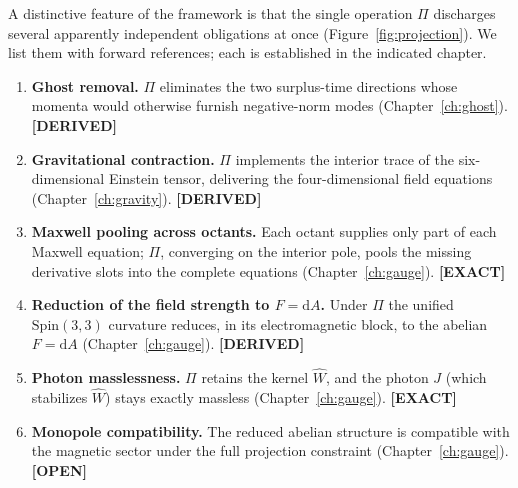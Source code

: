 \documentclass[11pt,oneside]{book}
\newcommand{\Wh}{\hat{W}}                         %
\newcommand{\dd}{\mathrm{d}}
\newcommand{\Spin}{\mathrm{Spin}}
\newcommand{\status}[1]{{\sffamily\bfseries\color{statuscol}[#1]}}
\theoremstyle{plain}
\theoremstyle{definition}
\theoremstyle{remark}
\begin{document}
A distinctive feature of the framework is that the single operation $\Pi$
discharges several apparently independent obligations at once
(Figure~\ref{fig:projection}). We list them with forward references; each is
established in the indicated chapter.

\begin{enumerate}[leftmargin=1.5em,itemsep=2pt]
\item \textbf{Ghost removal.} $\Pi$ eliminates the two surplus-time directions
whose momenta would otherwise furnish negative-norm modes
(Chapter~\ref{ch:ghost}). \status{DERIVED}
\item \textbf{Gravitational contraction.} $\Pi$ implements the interior trace of
the six-dimensional Einstein tensor, delivering the four-dimensional field
equations (Chapter~\ref{ch:gravity}). \status{DERIVED}
\item \textbf{Maxwell pooling across octants.} Each octant supplies only part of
each Maxwell equation; $\Pi$, converging on the interior pole, pools the missing
derivative slots into the complete equations (Chapter~\ref{ch:gauge}).
\status{EXACT}
\item \textbf{Reduction of the field strength to $F=\dd A$.} Under $\Pi$ the
unified $\Spin(3,3)$ curvature reduces, in its electromagnetic block, to the
abelian $F=\dd A$ (Chapter~\ref{ch:gauge}). \status{DERIVED}
\item \textbf{Photon masslessness.} $\Pi$ retains the kernel $\Wh$, and the photon
$J$ (which stabilizes $\Wh$) stays exactly massless (Chapter~\ref{ch:gauge}).
\status{EXACT}
\item \textbf{Monopole compatibility.} The reduced abelian structure is compatible
with the magnetic sector under the full projection constraint
(Chapter~\ref{ch:gauge}). \status{OPEN}
\end{enumerate}
\end{document}
